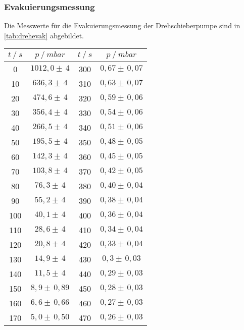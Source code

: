 \subsubsection{Evakuierungsmessung}

Die Messwerte für die Evakuierungsmessung der Drehschieberpumpe sind in \autoref{tab:drehevak} abgebildet.

\begin{table}[H]
  \centering
  \begin{tabular}{c|c||c|c}
    {$t \:/\: \si{s}$} & {$p \:/\: \si{mbar} $} & {$t \:/\: \si{s}$} & {$p \:/\: \si{mbar} $}\\
  \midrule
  0     & $ 1012,0  \pm \,  4 $ &  300  & $ 0,67  \pm \,  0,07 $ \\ 
  10    & $ 636,3  \pm \,  4 $  &  310  & $ 0,63  \pm \,  0,07 $ \\
  20    & $ 474,6  \pm \,  4 $  &  320  & $ 0,59  \pm \,  0,06 $ \\
  30    & $ 356,4  \pm \,  4 $  &  330  & $ 0,54  \pm \,  0,06 $ \\
  40    & $ 266,5  \pm \,  4 $  &  340  & $ 0,51  \pm \,  0,06 $ \\
  50    & $ 195,5  \pm \,  4 $  &  350  & $ 0,48  \pm \,  0,05 $ \\
  60    & $ 142,3  \pm \,  4 $  &  360  & $ 0,45  \pm \,  0,05 $ \\
  70    & $ 103,8  \pm \,  4 $  &  370  & $ 0,42  \pm \,  0,05 $ \\
  80    & $ 76,3  \pm \,  4 $    &  380  & $ 0,40  \pm \,  0,04 $ \\
  90    & $ 55,2  \pm \,  4 $    &  390  & $ 0,38  \pm \,  0,04 $ \\
  100   & $ 40,1  \pm \,  4 $    &  400  & $ 0,36  \pm \,  0,04 $ \\
  110   & $ 28,6  \pm \,  4 $    &  410  & $ 0,34  \pm \,  0,04 $ \\
  120   & $ 20,8  \pm \,  4 $    &   420  & $ 0,33  \pm \,  0,04 $ \\
  130   & $ 14,9  \pm \,  4 $       &  430  & $ 0,3  \pm \,  0,03 $ \\
  140   & $ 11,5  \pm \,  4 $       &  440  & $ 0,29  \pm \,  0,03 $ \\
  150   & $ 8,9   \pm \,  0,89 $    &  450  & $ 0,28  \pm \,  0,03 $ \\
  160   & $ 6,6   \pm \,  0,66 $    &  460  & $ 0,27  \pm \,  0,03 $ \\
  170   & $ 5,0   \pm \,  0,50 $     &  470  & $ 0,26  \pm \,  0,03 $ \\

\end{tabular}
\end{table}
